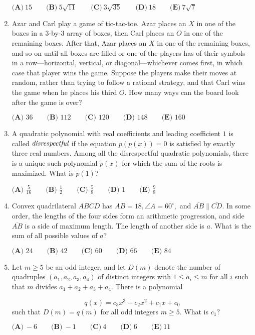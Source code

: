 \documentclass{article}
\begin{document}
\begin{enumerate}[label=\arabic*., itemsep=0.5em]
\(\textbf{(A)}\: 15\qquad\textbf{(B)} \: 5\sqrt{11}\qquad\textbf{(C)} \: 3\sqrt{35}\qquad\textbf{(D)} \: 18\qquad\textbf{(E)} \: 7\sqrt{7}\)\par \vspace{0.5em}\item Azar and Carl play a game of tic-tac-toe. Azar places an \(X\) in one of the boxes in a \(3\)-by-\(3\) array of boxes, then Carl places an \(O\) in one of the remaining boxes. After that, Azar places an \(X\) in one of the remaining boxes, and so on until all boxes are filled or one of the players has of their symbols in a row—horizontal, vertical, or diagonal—whichever comes first, in which case that player wins the game. Suppose the players make their moves at random, rather than trying to follow a rational strategy, and that Carl wins the game when he places his third \(O\). How many ways can the board look after the game is over?

\(\textbf{(A) } 36 \qquad\textbf{(B) } 112 \qquad\textbf{(C) } 120 \qquad\textbf{(D) } 148 \qquad\textbf{(E) } 160\)\par \vspace{0.5em}\item A quadratic polynomial with real coefficients and leading coefficient \(1\) is called \(\emph{disrespectful}\) if the equation \(p(p(x))=0\) is satisfied by exactly three real numbers. Among all the disrespectful quadratic polynomials, there is a unique such polynomial \(\tilde{p}(x)\) for which the sum of the roots is maximized. What is \(\tilde{p}(1)\)?

\(\textbf{(A) } \frac{5}{16} \qquad\textbf{(B) } \frac{1}{2} \qquad\textbf{(C) } \frac{5}{8} \qquad\textbf{(D) } 1 \qquad\textbf{(E) } \frac{9}{8}\)\par \vspace{0.5em}\item Convex quadrilateral \(ABCD\) has \(AB = 18, \angle{A} = 60^\circ,\) and \(\overline{AB} \parallel \overline{CD}.\) In some order, the lengths of the four sides form an arithmetic progression, and side \(\overline{AB}\) is a side of maximum length. The length of another side is \(a.\) What is the sum of all possible values of \(a\)?

\(\textbf{(A) } 24 \qquad \textbf{(B) } 42 \qquad \textbf{(C) } 60 \qquad \textbf{(D) } 66 \qquad \textbf{(E) } 84\)\par \vspace{0.5em}\item Let \(m\ge 5\) be an odd integer, and let \(D(m)\) denote the number of quadruples \((a_1, a_2, a_3, a_4)\) of distinct integers with \(1\le a_i \le m\) for all \(i\) such that \(m\) divides \(a_1+a_2+a_3+a_4\). There is a polynomial

\begin{equation*}
q(x) = c_3x^3+c_2x^2+c_1x+c_0
\end{equation*}
such that \(D(m) = q(m)\) for all odd integers \(m\ge 5\). What is \(c_1?\)

\(\textbf{(A)}\ {-}6\qquad\textbf{(B)}\ {-}1\qquad\textbf{(C)}\ 4\qquad\textbf{(D)}\ 6\qquad\textbf{(E)}\ 11\)\par \vspace{0.5em}\end{enumerate}
\end{document}
